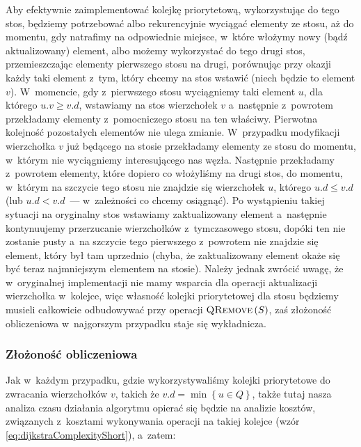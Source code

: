 Aby efektywnie zaimplementować kolejkę priorytetową, wykorzystując do tego stos, będziemy potrzebować albo rekurencyjnie wyciągać elementy ze stosu, aż do momentu, gdy natrafimy na odpowiednie miejsce, w~które włożymy nowy (bądź aktualizowany) element, albo możemy wykorzystać do tego drugi stos, przemieszczając elementy pierwszego stosu na drugi, porównując przy okazji każdy taki element z~tym, który chcemy na stos wstawić (niech będzie to element $v$). W~momencie, gdy z~pierwszego stosu wyciągniemy taki element $u$, dla którego $u.v \geqslant v.d$, wstawiamy na stos wierzchołek $v$ a~następnie z~powrotem przekładamy elementy z~pomocniczego stosu na ten właściwy. Pierwotna kolejność pozostałych elementów nie ulega zmianie. W~przypadku modyfikacji wierzchołka $v$ już będącego na stosie przekładamy elementy ze stosu do momentu, w~którym nie wyciągniemy interesującego nas węzła. Następnie przekładamy z~powrotem elementy, które dopiero co włożyliśmy na drugi stos, do momentu, w~którym na szczycie tego stosu nie znajdzie się wierzchołek $u$, którego $u.d \leqslant v.d$ (lub $u.d < v.d$~--- w~zależności co chcemy osiągnąć). Po wystąpieniu takiej sytuacji na oryginalny stos wstawiamy zaktualizowany element a~następnie kontynuujemy przerzucanie wierzchołków z~tymczasowego stosu, dopóki ten nie zostanie pusty a~na szczycie tego pierwszego z~powrotem nie znajdzie się element, który był tam uprzednio (chyba, że zaktualizowany element okaże się być teraz najmniejszym elementem na stosie). Należy jednak zwrócić uwagę, że w~oryginalnej implementacji nie mamy wsparcia dla operacji aktualizacji wierzchołka w~kolejce, więc własność kolejki priorytetowej dla stosu będziemy musieli całkowicie odbudowywać przy operacji $\textrm{\textsc{QRemove}} \left( S \right) $, zaś złożoność obliczeniowa w~najgorszym przypadku staje się wykładnicza.

\subsubsection{Złożoność obliczeniowa}

Jak w~każdym przypadku, gdzie wykorzystywaliśmy kolejki priorytetowe do zwracania wierzchołków $v$, takich że $v.d = \min \left\{ u \in Q \right\}$, także tutaj nasza analiza czasu działania algorytmu opierać się będzie na analizie kosztów, związanych z~kosztami wykonywania operacji na takiej kolejce (wzór \ref{eq:dijkstraComplexityShort}), a~zatem:

